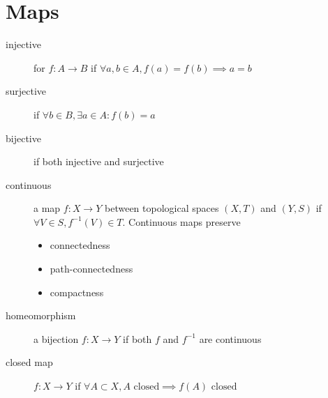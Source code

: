 \documentclass[tbtags,columns=2]{cheatsheet}
\begin{document}
\section{Maps}
\begin{description}
    \item[injective] for $f:A\to B$ if $\forall a,b \in A, f(a)=f(b)\implies a = b$
    \item[surjective] if $\forall b \in B, \exists a \in A : f(b)=a$
    \item[bijective] if both injective and surjective
    \item[continuous] a map $f:X \to Y$ between topological spaces $(X,T)$ and $(Y,S)$ if $\forall V \in S, f^{-1}(V)\in T$. Continuous maps preserve \begin{itemize}
        \item connectedness
        \item path-connectedness
        \item compactness
    \end{itemize}
    \item[homeomorphism] a bijection $f:X\to Y$ if both $f$ and $f^{-1}$ are continuous
    \item[closed map] $f:X\to Y$ if $\forall A \subset X, A\text{ closed} \implies f(A)\text{ closed}$
\end{description}
\end{document}
